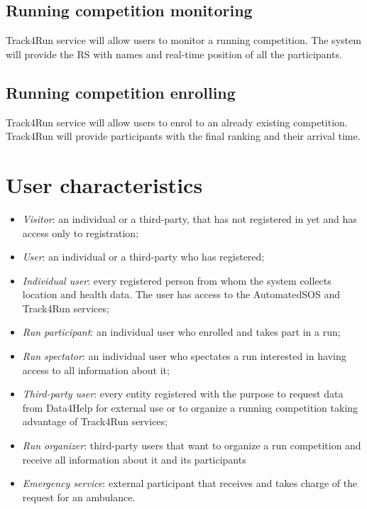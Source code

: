 \subsection{Running competition monitoring}
Track4Run service will allow users to monitor a running competition. The system will provide the RS with names and real-time position of all the participants.
\subsection{Running competition enrolling}
Track4Run service will allow users to enrol to an already existing competition. Track4Run will provide participants with the final ranking and their arrival time.

\section{User characteristics}
\begin{itemize}
\item	\textit{Visitor}: an individual or a third-party, that has not registered in yet and has access only to registration;
\item	\textit{User}:  an individual or a third-party who has registered;
\item	\textit{Individual user}: every registered person from whom the system collects location and health data. The user has access to the AutomatedSOS and Track4Run services;
\item	\textit{Run participant}: an individual user who enrolled and takes part in a run;
\item	\textit{Run spectator}: an individual user who spectates a run interested in having access to all information about it;
\item \textit{Third-party user}: every entity registered with the purpose to request data from Data4Help for external use or to organize a running competition taking advantage of Track4Run services;
\item	\textit{Run organizer}: third-party users that want to organize a run competition and receive all information about it and its participants
\item	\textit{Emergency service}: external participant that receives and takes charge of the request for an ambulance.
\end{itemize}

